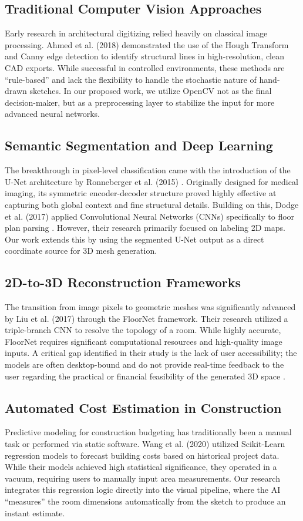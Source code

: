 \documentclass[10pt, conference, a4paper]{IEEEtran}
\begin{document}
\subsection{Traditional Computer Vision Approaches}
Early research in architectural digitizing relied heavily on classical image processing. Ahmed et al. (2018) demonstrated the use of the Hough Transform and Canny edge detection to identify structural lines in high-resolution, clean CAD exports. While successful in controlled environments, these methods are ``rule-based'' and lack the flexibility to handle the stochastic nature of hand-drawn sketches. In our proposed work, we utilize OpenCV not as the final decision-maker, but as a preprocessing layer to stabilize the input for more advanced neural networks.

\subsection{Semantic Segmentation and Deep Learning}
The breakthrough in pixel-level classification came with the introduction of the U-Net architecture by Ronneberger et al. (2015) \cite{1}. Originally designed for medical imaging, its symmetric encoder-decoder structure proved highly effective at capturing both global context and fine structural details. Building on this, Dodge et al. (2017) applied Convolutional Neural Networks (CNNs) specifically to floor plan parsing \cite{11}. However, their research primarily focused on labeling 2D maps. Our work extends this by using the segmented U-Net output as a direct coordinate source for 3D mesh generation.

\subsection{2D-to-3D Reconstruction Frameworks}
The transition from image pixels to geometric meshes was significantly advanced by Liu et al. (2017) \cite{10} through the FloorNet framework. Their research utilized a triple-branch CNN to resolve the topology of a room. While highly accurate, FloorNet requires significant computational resources and high-quality image inputs. A critical gap identified in their study is the lack of user accessibility; the models are often desktop-bound and do not provide real-time feedback to the user regarding the practical or financial feasibility of the generated 3D space \cite{5}.

\subsection{Automated Cost Estimation in Construction}
Predictive modeling for construction budgeting has traditionally been a manual task or performed via static software. Wang et al. (2020) \cite{13} utilized Scikit-Learn regression models \cite{3} to forecast building costs based on historical project data. While their models achieved high statistical significance, they operated in a vacuum, requiring users to manually input area measurements. Our research integrates this regression logic directly into the visual pipeline, where the AI ``measures'' the room dimensions automatically from the sketch to produce an instant estimate.
\end{document}
